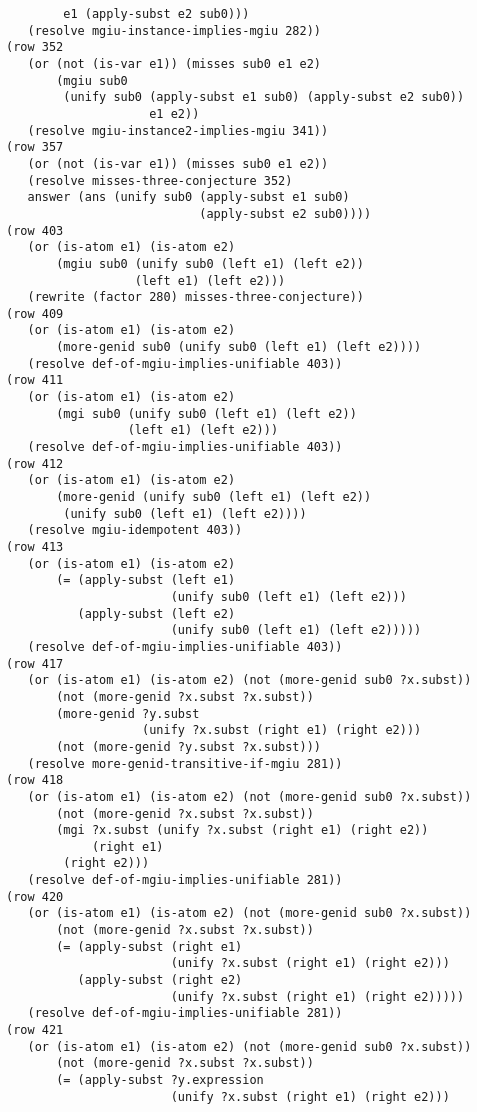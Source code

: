 \documentclass[runningheads]{llncs}
\begin{document}
\begin{verbatim}
        e1 (apply-subst e2 sub0)))
   (resolve mgiu-instance-implies-mgiu 282))
(row 352
   (or (not (is-var e1)) (misses sub0 e1 e2)
       (mgiu sub0
        (unify sub0 (apply-subst e1 sub0) (apply-subst e2 sub0)) 
                    e1 e2))
   (resolve mgiu-instance2-implies-mgiu 341))
(row 357
   (or (not (is-var e1)) (misses sub0 e1 e2))
   (resolve misses-three-conjecture 352)
   answer (ans (unify sub0 (apply-subst e1 sub0) 
                           (apply-subst e2 sub0))))
(row 403
   (or (is-atom e1) (is-atom e2)
       (mgiu sub0 (unify sub0 (left e1) (left e2)) 
                  (left e1) (left e2)))
   (rewrite (factor 280) misses-three-conjecture))
(row 409
   (or (is-atom e1) (is-atom e2)
       (more-genid sub0 (unify sub0 (left e1) (left e2))))
   (resolve def-of-mgiu-implies-unifiable 403))
(row 411
   (or (is-atom e1) (is-atom e2)
       (mgi sub0 (unify sub0 (left e1) (left e2)) 
                 (left e1) (left e2)))
   (resolve def-of-mgiu-implies-unifiable 403))
(row 412
   (or (is-atom e1) (is-atom e2)
       (more-genid (unify sub0 (left e1) (left e2))
        (unify sub0 (left e1) (left e2))))
   (resolve mgiu-idempotent 403))
(row 413
   (or (is-atom e1) (is-atom e2)
       (= (apply-subst (left e1) 
                       (unify sub0 (left e1) (left e2)))
          (apply-subst (left e2) 
                       (unify sub0 (left e1) (left e2)))))
   (resolve def-of-mgiu-implies-unifiable 403))
(row 417
   (or (is-atom e1) (is-atom e2) (not (more-genid sub0 ?x.subst))
       (not (more-genid ?x.subst ?x.subst))
       (more-genid ?y.subst 
                   (unify ?x.subst (right e1) (right e2)))
       (not (more-genid ?y.subst ?x.subst)))
   (resolve more-genid-transitive-if-mgiu 281))
(row 418
   (or (is-atom e1) (is-atom e2) (not (more-genid sub0 ?x.subst))
       (not (more-genid ?x.subst ?x.subst))
       (mgi ?x.subst (unify ?x.subst (right e1) (right e2)) 
            (right e1)
        (right e2)))
   (resolve def-of-mgiu-implies-unifiable 281))
(row 420
   (or (is-atom e1) (is-atom e2) (not (more-genid sub0 ?x.subst))
       (not (more-genid ?x.subst ?x.subst))
       (= (apply-subst (right e1)
                       (unify ?x.subst (right e1) (right e2)))
          (apply-subst (right e2)
                       (unify ?x.subst (right e1) (right e2)))))
   (resolve def-of-mgiu-implies-unifiable 281))
(row 421
   (or (is-atom e1) (is-atom e2) (not (more-genid sub0 ?x.subst))
       (not (more-genid ?x.subst ?x.subst))
       (= (apply-subst ?y.expression
                       (unify ?x.subst (right e1) (right e2)))

\end{verbatim}
\end{document}
